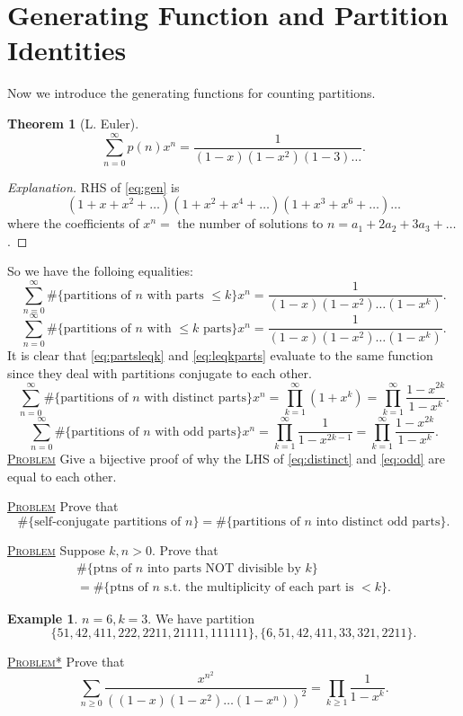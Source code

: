 \documentclass{report}
\newcommand{\fancyem}[1]{\underline{\textsc{#1}}}
\newtheorem{theorem}{Theorem}[section]
\theoremstyle{definition}
\newtheorem{example}{Example}[section]
\theoremstyle{remark}
\numberwithin{equation}{section}
\newcommand{\fnl}{\parbox[t]{0\linewidth}{}}
\begin{document}
\section{Generating Function and Partition Identities}
Now we introduce the generating functions for counting partitions.
\begin{theorem}[L. Euler]\fnl
    \begin{equation}\label{eq:gen}
        \sum_{n=0}^\infty p(n)x^n = \frac{1}{(1 - x)(1 - x^2)(1 - 3)\ldots}.
    \end{equation}
\end{theorem}
\begin{proof}[Explanation]
    RHS of \eqref{eq:gen} is \[
        (1 + x + x^2 + \ldots)(1 + x^2 + x^4 + \ldots)(1 + x^3 + x^6 + \ldots)\ldots
    \]
    where the coefficients of $x^n = $ the number of solutions to $n = a_1 + 2a_2 + 3a_3 + \ldots$.
\end{proof}
So we have the folloing equalities: 
\begin{equation}\label{eq:partsleqk}
    \sum_{n=0}^\infty \#\{\text{partitions of $n$ with parts $\leq k$}\}x^n = \frac{1}{(1-x)(1-x^2)\ldots(1-x^k)}.
\end{equation}
\begin{equation}\label{eq:leqkparts}
    \sum_{n=0}^\infty \#\{\text{partitions of $n$ with $\leq k$ parts}\}x^n = \frac{1}{(1-x)(1-x^2)\ldots(1-x^k)}.
\end{equation}
It is clear that \eqref{eq:partsleqk} and \eqref{eq:leqkparts} evaluate to the same function since they deal with partitions conjugate to each other.
\begin{equation}\label{eq:distinct}
    \sum_{n=0}^\infty \#\{\text{partitions of $n$ with distinct parts}\}x^n = \prod_{k=1}^\infty(1 + x^k) = \prod_{k=1}^\infty \frac{1 - x^{2k}}{1-x^k}.
\end{equation}
\begin{equation}\label{eq:odd}
    \sum_{n=0}^\infty \#\{\text{partitions of $n$ with odd parts}\}x^n = \prod_{k=1}^\infty \frac{1}{1-x^{2k-1}} = \prod_{k=1}^\infty \frac{1 - x^{2k}}{1-x^k}.
\end{equation}
\fancyem{Problem} Give a bijective proof of why the LHS of \eqref{eq:distinct} and \eqref{eq:odd} are equal to each other.

\fancyem{Problem} Prove that \[
    \#\{\text{self-conjugate partitions of $n$}\} = \#\{\text{partitions of $n$ into distinct odd parts}\}.   
\]

\fancyem{Problem} Suppose $k, n > 0$. Prove that \begin{multline*}
    \#\{\text{ptns of $n$ into parts NOT divisible by $k$}\} \\ 
    = \#\{\text{ptns of $n$ s.t. the multiplicity of each part is $< k$}\}.
\end{multline*}
\begin{example}
    $n = 6, k = 3$. We have partition
    \[
        \{51, 42, 411, 222, 2211, 21111, 111111\}, \{6, 51, 42, 411, 33, 321, 2211\}.
    \]
\end{example}
\fancyem{Problem*} Prove that 
\[
    \sum_{n \geq 0} \frac{x^{n^2}}{((1-x)(1-x^2)\ldots(1-x^n))^2} = \prod_{k \geq 1}\frac{1}{1-x^k}.    
\]
\end{document}
